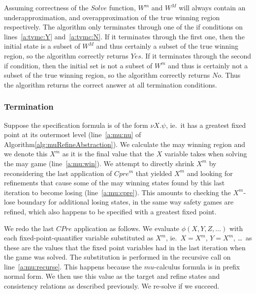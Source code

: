 Assuming correctness of the $Solve$ function, $W^m$ and $W^M$ will always contain an underapproximation, and overapproximation of the true winning region respectively. The algorithm only terminates through one of the if conditions on lines~\ref{a:tvmc:Y} and~\ref{a:tvmc:N}. If it terminates through the first one, then the initial state is a subset of $W^M$ and thus certainly a subset of the true winning region, so the algorithm correctly returns $Yes$. If it terminates through the second if condition, then the initial set is not a subset of $W^m$ and thus is certainly not a subset of the true winning region, so the algorithm correctly returns $No$. Thus the algorithm returns the correct answer at all termination conditions.

\subsubsection{Termination}

Suppose the specification formula is of the form $\nu X. \psi$, ie.\ it has a greatest fixed point at its outermost level (line~\ref{a:mu:nu} of Algorithm\ref{alg:muRefineAbstraction}). We calculate the may winning region and we denote this $X^m$ as it is the final value that the $X$ variable takes when solving the may game (line~\ref{a:mu:win}). We attempt to directly shrink $X^m$ by reconsidering the last application of $Cpre^m$ that yielded $X^m$ and looking for refinements that cause some of the may winning states found by this last iteration to become losing (line~\ref{a:mu:cpre}). This amounts to checking the $X^m$-lose boundary for additional losing states, in the same way safety games are refined, which also happens to be specified with a greatest fixed point.

We redo the last $CPre$ application as follows. We evaluate $\phi(X, Y, Z, \ldots)$ with each fixed-point-quantifier variable substituted as $X^m$, ie.\ $X=X^m$, $Y=X^m$, \ldots \ as these are the values that the fixed point variables had in the last iteration when the game was solved. The substitution is performed in the recursive call on line~\ref{a:mu:recurse}. This happens because the $mu$-calculus formula is in prefix normal form. We then use this value as the target and refine states and consistency relations as described previously. We re-solve if we succeed.

